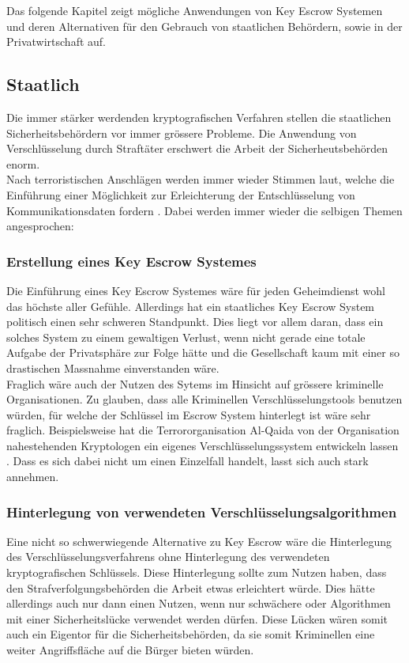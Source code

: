 Das folgende Kapitel zeigt mögliche Anwendungen von Key Escrow Systemen und deren Alternativen für den Gebrauch von staatlichen Behördern, sowie in der Privatwirtschaft auf.
	
	\subsection{Staatlich}
Die immer stärker werdenden kryptografischen Verfahren stellen die staatlichen Sicherheitsbehördern vor immer grössere Probleme. Die Anwendung von Verschlüsselung durch Straftäter erschwert die Arbeit der Sicherheutsbehörden enorm. \\
Nach terroristischen Anschlägen werden immer wieder Stimmen laut, welche die Einführung einer Möglichkeit zur Erleichterung der Entschlüsselung von Kommunikationsdaten fordern \cite{insideit} \cite{annabiselli} \cite{denning}. 
Dabei werden immer wieder die selbigen Themen angesprochen:

	\subsubsection{Erstellung eines Key Escrow Systemes}
Die Einführung eines Key Escrow Systemes wäre für jeden Geheimdienst wohl das höchste aller Gefühle. Allerdings hat ein staatliches Key Escrow System politisch einen sehr schweren Standpunkt. Dies liegt vor allem daran, dass ein solches System zu einem gewaltigen Verlust, wenn nicht gerade eine totale Aufgabe der Privatsphäre zur Folge hätte und die Gesellschaft kaum mit einer so drastischen Massnahme einverstanden wäre.\cite {insideit} \\
Fraglich wäre auch der Nutzen des Sytems im Hinsicht auf grössere kriminelle Organisationen. Zu glauben, dass alle Kriminellen Verschlüsselungstools benutzen würden, für welche der Schlüssel im Escrow System hinterlegt ist wäre sehr fraglich. Beispielsweise hat die Terrororganisation Al-Qaida von der Organisation nahestehenden Kryptologen ein eigenes Verschlüsselungssystem entwickeln lassen \cite{denning}. Dass es sich dabei nicht um einen Einzelfall handelt, lasst sich auch stark annehmen.
	
	\subsubsection{Hinterlegung von verwendeten Verschlüsselungsalgorithmen}
Eine nicht so schwerwiegende Alternative zu Key Escrow wäre die Hinterlegung des Verschlüsselungsverfahrens ohne Hinterlegung des verwendeten kryptografischen Schlüssels. Diese Hinterlegung sollte zum Nutzen haben, dass den Strafverfolgungsbehörden die Arbeit etwas erleichtert würde. Dies hätte allerdings auch nur dann einen Nutzen, wenn nur schwächere oder Algorithmen mit einer Sicherheitslücke verwendet werden dürfen. Diese Lücken wären somit auch ein Eigentor für die Sicherheitsbehörden, da sie somit Kriminellen eine weiter Angriffsfläche auf die Bürger bieten würden. \cite{adminch} %

